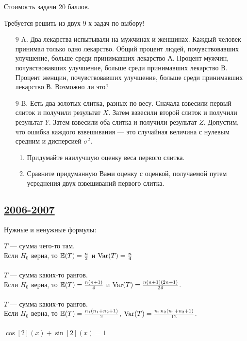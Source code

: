 Стоимость задачи 20 баллов.

Требуется решить \textbf{} из двух 9-х задач по
выбору!

\begin{enumerate}
\item[9-A.] Два лекарства испытывали на мужчинах и женщинах. Каждый
человек принимал только одно лекарство. Общий процент людей,
почувствовавших улучшение, больше среди принимавших лекарство А.
Процент мужчин, почувствовавших улучшение, больше среди принимавших лекарство В. Процент женщин, почувствовавших улучшение, больше среди принимавших лекарство В. Возможно ли это?

\item[9-B.] Есть два золотых слитка, разных по весу. Сначала взвесили первый слиток и получили результат $X$. Затем взвесили второй слиток и получили результат $Y$. Затем взвесили оба слитка и получили результат $Z$. Допустим, что ошибка каждого взвешивания — это случайная величина с нулевым средним и дисперсией $\sigma^{2}$.
\begin{enumerate}
\item Придумайте наилучшую оценку веса первого слитка.
\item Сравните придуманную Вами оценку с оценкой, получаемой путем усреднения двух взвешиваний первого слитка.
\end{enumerate}
\end{enumerate}


\subsection[2006-2007]{\hyperref[sec:sol_kr_03_2006_2007]{2006-2007}}
\label{sec:kr_03_2006_2007}

Нужные и ненужные формулы:


$T$ — сумма чего-то там. \\
Если $H_{0}$ верна, то $\operatorname{\mathbb{E}}(T)=\frac{n}{2}$ и $\operatorname{Var}(T)=\frac{n}{4}$ \\ \\
$T$ — сумма каких-то рангов. \\
Если $H_{0}$ верна, то $\operatorname{\mathbb{E}}(T)=\frac{n(n+1)}{4}$ и
$\operatorname{Var}(T)=\frac{n(n+1)(2n+1)}{24}$. \\ \\
$T$ — сумма каких-то рангов. \\
Если $H_{0}$ верна, то $\operatorname{\mathbb{E}}(T)=\frac{n_{1}(n_{1}+n_{2}+1)}{2}$,
$\operatorname{Var}(T)=\frac{n_{1}n_{2}(n_{1}+n_{2}+1)}{12}$. \\ \\
$\cos[2](x)+\sin[2](x)=1$ \\

